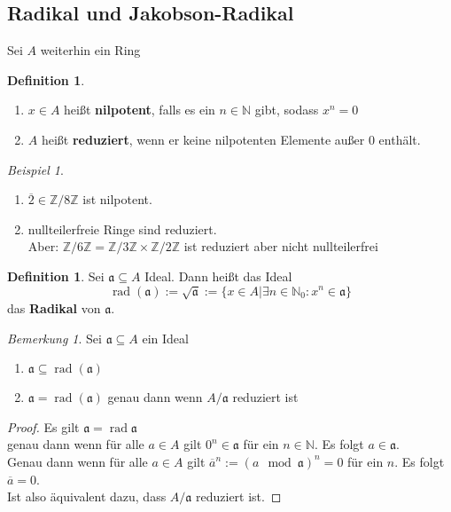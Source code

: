 \documentclass[10pt,a4paper]{article}
\newcommand{\N}{\ensuremath{\mathbb{N}}}
\newcommand{\Z}{\ensuremath{\mathbb{Z}}}
\newcommand{\ol}[1]{\overline{#1}}
\newcommand{\rad}{\ensuremath{\operatorname{rad}}}
\newcounter{thm}[section]
\theoremstyle{definition}
\newtheorem{definition}[thm]{Definition}
\theoremstyle{plain}
\theoremstyle{remark}
\newtheorem{bem}[thm]{Bemerkung}
\newtheorem*{exm*}{Beispiel}
\begin{document}
\subsection{Radikal und Jakobson-Radikal}
Sei $A$ weiterhin ein Ring

\begin{definition}
	\begin{enumerate}
		\item $x\in A$ heißt \textbf{nilpotent}, falls es ein $n\in \N$ gibt, sodass $x^n=0$
		\item $A$ heißt \textbf{reduziert}, wenn er keine nilpotenten Elemente außer $0$ enthält.
	\end{enumerate}
\end{definition}

\begin{exm*}
	\begin{enumerate}
		\item $\ol 2\in\Z/8\Z$ ist nilpotent.
		\item nullteilerfreie Ringe sind reduziert.\\
		Aber: $\Z/6\Z=\Z/3\Z\times \Z/2\Z$ ist reduziert aber nicht nullteilerfrei
	\end{enumerate}
\end{exm*}

\begin{definition}
	Sei $\mathfrak a\subseteq A$ Ideal. Dann heißt das Ideal
	\[\rad(\mathfrak a):=\sqrt{\mathfrak a}:=\{x\in A|\exists n\in \N_0:x^n\in\mathfrak a\}\]
	das \textbf{Radikal} von $\mathfrak a$.
\end{definition}

\begin{bem}
	Sei $\mathfrak a\subseteq A$ ein Ideal
	\begin{enumerate}
		\item $\mathfrak a\subseteq \rad(\mathfrak a)$
		\item $\mathfrak a=\rad(\mathfrak a)$ genau dann wenn $A/\mathfrak a$ reduziert ist
	\end{enumerate}
\end{bem}
\begin{proof}
	Es gilt $\mathfrak a=\rad\mathfrak a$ \\
	genau dann wenn für alle $a\in A$ gilt $0^n\in\mathfrak a$ für ein $n\in\N$. Es folgt $a\in\mathfrak a$.\\
	Genau dann wenn für alle $a\in A$ gilt $\ol{a}^n:=(a\mod\mathfrak a)^n=0$ für ein $n$. Es folgt $\ol a=0$.\\
	Ist also äquivalent dazu, dass $A/\mathfrak a$ reduziert ist.
\end{proof}
\end{document}
